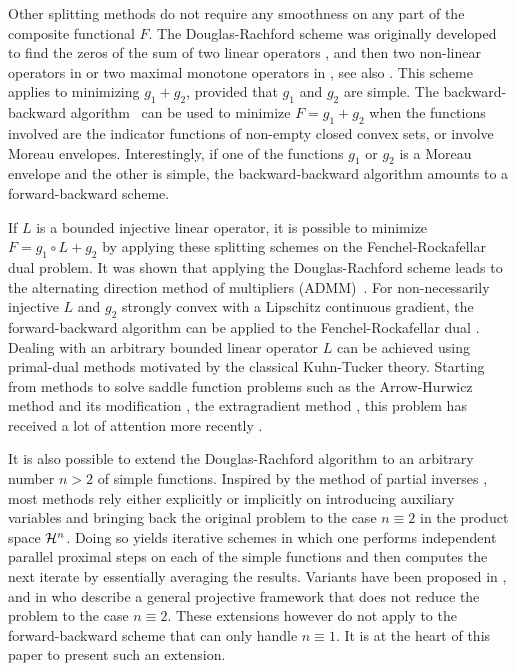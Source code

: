 Other splitting methods do not require any smoothness on any part of the composite functional $F$. The Douglas-Rachford scheme was originally developed to find the zeros of the sum of two linear operators \cite{DouglasRachford56}, and then two non-linear operators in \cite{Lieutaud69} or two maximal monotone operators in \cite{LionsMercier79}, see also \cite{Combettes04,EcksteinBertsekas92}. This scheme applies to minimizing $g_1 + g_2$, provided that $g_1$ and $g_2$ are simple. The backward-backward algorithm~\cite{AckerPrestel80,Bauschke05,Combettes04,Lions78,Passty79} can be used to minimize $F = g_1 + g_2$ when the functions involved are the indicator functions of non-empty closed convex sets, or involve Moreau envelopes.  Interestingly, if one of the functions $g_1$ or $g_2$ is a Moreau envelope and the other is simple, the backward-backward algorithm amounts to a forward-backward scheme.

If $L$ is a bounded injective linear operator, it is possible to minimize $F = g_1 \circ L + g_2$ by applying these splitting schemes on the Fenchel-Rockafellar dual problem. It was shown that applying the Douglas-Rachford scheme leads to the alternating direction method of multipliers (ADMM)~\cite{EcksteinBertsekas92,FortinGlowinski83,Gabay83,GabayMercier76,GlowinskiLeTallec89}. For non-necessarily injective $L$ and $g_2$ strongly convex with a Lipschitz continuous gradient, the forward-backward algorithm can be applied to the Fenchel-Rockafellar dual \cite{Combettes10,FadiliPeyre10}. Dealing with an arbitrary bounded linear operator $L$ can be achieved using primal-dual methods motivated by the classical Kuhn-Tucker theory. Starting from methods to solve saddle function problems such as the Arrow-Hurwicz  method \cite{ArrowHurwicz58} and its modification \cite{Popov80}, the extragradient method \cite{Korpelevich76}, this problem has received a lot of attention more recently \cite{Briceno-AriasCombettes11,ChambollePock11,ChenTeboulle94,MonteiroSvaiter10,Solodov04,Tseng97}.

It is also possible to extend the Douglas-Rachford algorithm to an arbitrary number $n > 2$ of simple functions. Inspired by the method of partial inverses \cite[Section~5]{Spingarn83}, most methods rely either explicitly or implicitly on introducing auxiliary variables and bringing back the original problem to the case $n \equiv 2$ in the product space $\mathcal{H}^{n}$. Doing so yields iterative schemes in which one performs independent parallel proximal steps on each of the simple functions and then computes the next iterate by essentially averaging the results. Variants have been proposed in \cite{CombettesPesquet08}, and in \cite{EcksteinSvaiter09} who describe a general projective framework that does not reduce the problem to the case $n \equiv 2$. These extensions however do not apply to the forward-backward scheme that can only handle $n \equiv 1$. It is at the heart of this paper to present such an extension. 

